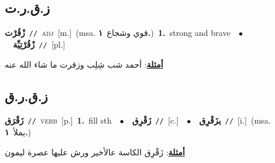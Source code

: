\documentclass[10pt,a4paper,twoside]{article} %
\begin{document}
\begin{multicols}{2}
\vspace{-3mm}
\subsection*{\color{blue}\foreignlanguage{arabic}{ز.ق.ر.ت}\color{blue}{ (ntws)}} 

{\setlength\topsep{0pt}\textbf{\foreignlanguage{arabic}{زْقُرْت}}\ {\color{gray}\texttt{//}\color{black}}\ \textsc{adj}\ [m.]\ \color{gray}(msa. \foreignlanguage{arabic}{قوي وشجاع}~\foreignlanguage{arabic}{\textbf{١.}})\color{black}\ \textbf{1.}~strong and brave\ \ $\bullet$\ \ \setlength\topsep{0pt}\textbf{\foreignlanguage{arabic}{زْقُرْتِيِّة}}\ {\color{gray}\texttt{//}\color{black}}\ [pl.]\  \begin{flushright}\color{gray}\foreignlanguage{arabic}{\textbf{\underline{\foreignlanguage{arabic}{أمثلة}}}: أحمد شب شِلِب وزقرت ما شاء الله عنه}\end{flushright}\color{black}} \vspace{2mm}

\vspace{-3mm}
\subsection*{\color{blue}\foreignlanguage{arabic}{ز.ق.ر.ق}\color{blue}{}} 

{\setlength\topsep{0pt}\textbf{\foreignlanguage{arabic}{زَقْرَق}}\ {\color{gray}\texttt{//}\color{black}}\ \textsc{verb}\ [p.]\ \textbf{1.}~fill sth\ \ $\bullet$\ \ \setlength\topsep{0pt}\textbf{\foreignlanguage{arabic}{زَقْرِق}}\ {\color{gray}\texttt{//}\color{black}}\ [c.]\ \ $\bullet$\ \ \setlength\topsep{0pt}\textbf{\foreignlanguage{arabic}{يزَقْرِق}}\ {\color{gray}\texttt{//}\color{black}}\ [i.]\ \color{gray}(msa. \foreignlanguage{arabic}{يملأ}~\foreignlanguage{arabic}{\textbf{١.}})\color{black}\  \begin{flushright}\color{gray}\foreignlanguage{arabic}{\textbf{\underline{\foreignlanguage{arabic}{أمثلة}}}: زَقْرِق الكاسة عالأخير ورش عليها عصرة ليمون}\end{flushright}\color{black}} \vspace{2mm}


\end{multicols}
\end{document}
